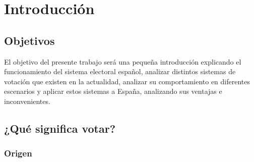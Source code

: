 \documentclass[12pt,a4paper,]{book}
\def\ifdoblecara{} %
\def\ifprincipal{} %
\numberwithin{dummy}{section}
\theoremstyle{ocrenumbox}
\theoremstyle{blacknumex}
\theoremstyle{blacknumbox}
\theoremstyle{ocrenum}
\theoremstyle{ocrenum}
\begin{document}
\cleardoublepage


\ifdefined\ifdoblecara
\fancyhead[LE,RO]{\scriptsize\rightmark}
\fancyfoot[LO,RE]{\scriptsize\slshape \leftmark}
\fancyfoot[C]{}
\fancyfoot[LE,RO]{\footnotesize\thepage}
\else
\fancyhead[RO]{\scriptsize\rightmark}
\fancyfoot[LO]{\scriptsize\slshape \leftmark}
\fancyfoot[C]{}
\fancyfoot[RO]{\footnotesize\thepage}
\fi

\renewcommand{\headrulewidth}{0.4pt}
\renewcommand{\footrulewidth}{0.4pt}

\ifdefined\ifprincipal
\else
\setlength{\parindent}{1em}
\pagestyle{fancy}
\setcounter{tocdepth}{4}
\tableofcontents

\fi

\ifdefined\ifdoblecara
\fancyhead{}{}
\fancyhead[LE,RO]{\scriptsize\rightmark}
\fancyfoot[LO,RE]{\scriptsize\slshape \leftmark}
\fancyfoot[C]{}
\fancyfoot[LE,RO]{\footnotesize\thepage}
\else
\fancyhead{}{}
\fancyhead[RO]{\scriptsize\rightmark}
\fancyfoot[LO]{\scriptsize\slshape \leftmark}
\fancyfoot[C]{}
\fancyfoot[RO]{\footnotesize\thepage}
\fi
\renewcommand{\headrulewidth}{0.4pt}
\renewcommand{\footrulewidth}{0.4pt}

\hypertarget{introducciuxf3n}{%
\chapter{Introducción}\label{introducciuxf3n}}

\hypertarget{objetivos}{%
\section{Objetivos}\label{objetivos}}

El objetivo del presente trabajo será una pequeña introducción
explicando el funcionamiento del sistema electoral español, analizar
distintos sistemas de votación que existen en la actualidad, analizar su
comportamiento en diferentes escenarios y aplicar estos sistemas a
España, analizando sus ventajas e inconvenientes.

\hypertarget{quuxe9-significa-votar}{%
\section{¿Qué significa votar?}\label{quuxe9-significa-votar}}

\hypertarget{origen}{%
\subsection{Origen}\label{origen}}
\end{document}

